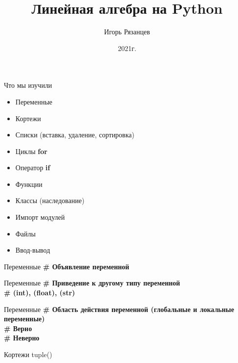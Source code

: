 \documentclass[12pt]{beamer}
\author{Игорь Рязанцев}
\title{Линейная алгебра на Python}
\institute{Лекция 04}
\date{2021г.}
\begin{document}
\begin{frame}
\titlepage
\end{frame}

\begin{frame}{Что мы изучили}
\begin{itemize}
\item Переменные 
\item Кортежи
\item Списки (вставка, удаление, сортировка)
\item Циклы \textbf{for}
\item Оператор \textbf{if}
\item Функции
\item Классы (наследование)
\item Импорт модулей
\item Файлы
\item Ввод-вывод 
\end{itemize}
\end{frame}


\begin{frame}{Переменные}
\textbf{\# Объявление переменной} \\
\vspace{0.5cm}

\end{frame}

\begin{frame}{Переменные}
\textbf{\# Приведение к другому типу переменной} \\
\textbf{\# (int), (float), (str) } \\
\vspace{0.0cm}

\end{frame}

\begin{frame}{Переменные}
\textbf{\# Область действия переменной (глобальные и локальные переменные)} \\
\vspace{0.4cm}
\textbf{\# Верно} \\

\vspace{0.4cm}
\textbf{\# Неверно} \\

\end{frame}


\begin{frame}{Кортежи tuple()}

\end{frame}
\end{document}
